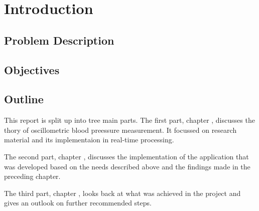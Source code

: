 \chapter{Introduction}\label{cp:Intro}

\section{Problem Description}



\section{Objectives}



\section{Outline}
This report is split up into tree main parts. The first part, chapter , discusses the thory of oscillometric blood preessure measurement. It focussed on research material and its implementaion in real-time processing. 

The second part, chapter , discusses the implementation of the application that was developed based on the needs described above and the findings made in the preceding chapter.

The third part, chapter , looks back at what was achieved in the project and gives an outlook on further recommended steps.

